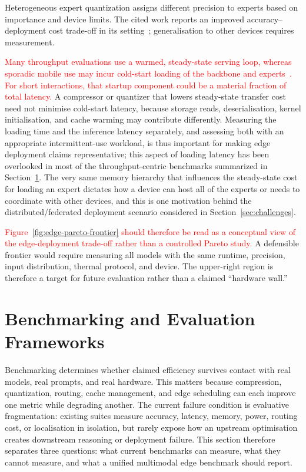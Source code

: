 \documentclass[10pt]{article}
\begin{document}
Heterogeneous expert quantization assigns different precision to experts based on
importance and device limits.  The cited work reports an improved accuracy--deployment
cost trade-off in its setting~\citep{11527015}; generalisation to other devices requires
measurement.

\textcolor{red}{Many throughput evaluations use a warmed, steady-state serving loop,
whereas sporadic mobile use may incur cold-start loading of the backbone and
experts~\citep{10906629}.  For short interactions,
that startup component could be a material fraction of total latency.}  A compressor or
quantizer that lowers steady-state transfer cost need not minimise cold-start latency,
because storage reads, deserialisation, kernel initialisation, and cache warming may
contribute differently.
Measuring the loading time and the inference latency separately, and assessing
both with an appropriate intermittent-use workload, is thus important for making edge
deployment claims representative; this aspect of loading latency has been
overlooked in most of the throughput-centric benchmarks summarized in
Section~\ref{sec:bench}. 
The very same memory hierarchy that influences the steady-state cost for
loading an expert dictates how a device can host all of the experts or needs to
coordinate with other devices, and this is one motivation behind the
distributed/federated deployment scenario considered in Section~\ref{sec:challenges}.

\textcolor{red}{Figure~\ref{fig:edge-pareto-frontier} should therefore be read as a
conceptual view of the edge-deployment trade-off rather than a controlled Pareto
study.}  A defensible frontier would
require measuring all models with the same runtime, precision, input distribution,
thermal protocol, and device.  The upper-right region is therefore a target for future
evaluation rather than a claimed ``hardware wall.''

\section{Benchmarking and Evaluation Frameworks}
\label{sec:bench}

Benchmarking determines whether claimed efficiency survives contact with real models,
real prompts, and real hardware.  This matters because compression, quantization,
routing, cache management, and edge scheduling can each improve one metric while
degrading another.  The current failure condition is evaluative fragmentation:
existing suites measure accuracy, latency, memory, power, routing cost, or localisation
in isolation, but rarely expose how an upstream optimisation creates downstream
reasoning or deployment failure.  This section therefore separates three questions:
what current benchmarks can measure, what they cannot measure, and what a unified
multimodal edge benchmark should report.
\end{document}
